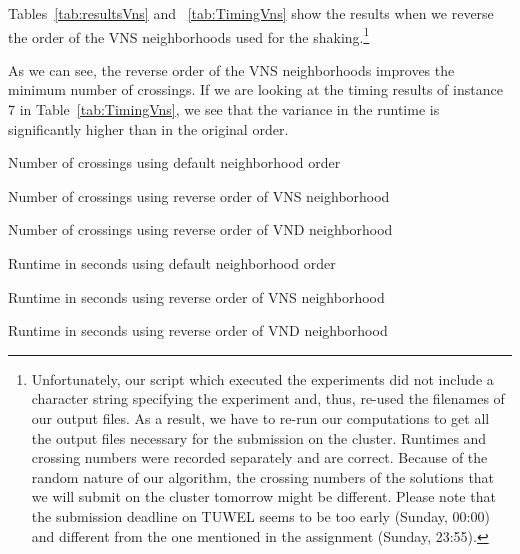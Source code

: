 \documentclass{scrartcl}
\begin{document}
Tables~\ref{tab:resultsVns} and ~\ref{tab:TimingVns} show the
results when we reverse the order of the VNS neighborhoods
used for the shaking.\footnote{Unfortunately, our script which executed
  the experiments did not include a character string specifying the
  experiment and, thus, re-used the filenames of our output files. As a result,
  we have to re-run our computations to get all the output files
  necessary for the submission on the cluster. Runtimes and crossing
  numbers were recorded separately and are correct. Because of the
  random nature of our algorithm, the crossing numbers of the solutions that we will
  submit on the cluster tomorrow might be different. Please note that
  the submission deadline on TUWEL seems to be too early (Sunday,
  00:00) and different from the one mentioned in the assignment
  (Sunday, 23:55).}

As we can see, the reverse order of the VNS neighborhoods improves the minimum number of crossings. If we are looking
at the timing results of instance 7 in Table~\ref{tab:TimingVns}, we see that the variance in the runtime is significantly
higher than in the original order.


\begin{table}[!H]
  \centering
  \scriptsize
  
\caption{Number of crossings using default neighborhood order}
\label{tab:resultsOverall}
\end{table}

\begin{table}[!H]
  \centering
  \scriptsize
  
\caption{Number of crossings using reverse order of VNS neighborhood}
\label{tab:resultsVns}
\end{table}

\begin{table}[!H]
  \centering
  \scriptsize
  
\caption{Number of crossings using reverse order of VND neighborhood}
\label{tab:resultsVnd}
\end{table}

\clearpage

\begin{table}[H]
  \centering
  \scriptsize
  
\caption{Runtime in seconds using default neighborhood order}
\label{tab:Timing}
\end{table}

\begin{table}[H]
  \centering
  \scriptsize
  
\caption{Runtime in seconds using reverse order of VNS neighborhood}
\label{tab:TimingVns}
\end{table}

\begin{table}[H]
  \centering
  \scriptsize
  
\caption{Runtime in seconds using reverse order of VND neighborhood}
\label{tab:TimingVnd}
\end{table}
\end{document}

